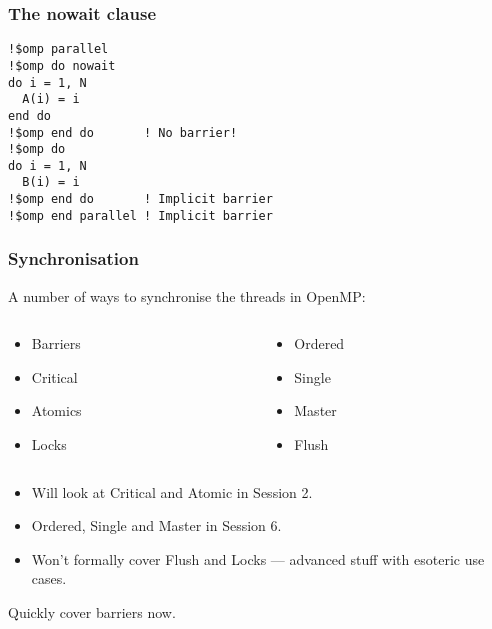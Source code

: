 \documentclass{beamer}
\begin{document}
\begin{frame}[fragile]
\frametitle{The nowait clause}

\begin{verbatim}
!$omp parallel
!$omp do nowait
do i = 1, N
  A(i) = i
end do
!$omp end do       ! No barrier!
!$omp do
do i = 1, N
  B(i) = i
!$omp end do       ! Implicit barrier
!$omp end parallel ! Implicit barrier
\end{verbatim}
\end{frame}

\begin{frame}
\frametitle{Synchronisation}
A number of ways to synchronise the threads in OpenMP:
\begin{columns}
\begin{column}{0.5\textwidth}
\begin{itemize}
  \item Barriers
  \item Critical
  \item Atomics
  \item Locks
\end{itemize}
\end{column}
\begin{column}{0.5\textwidth}
\begin{itemize}
  \item Ordered
  \item Single
  \item Master
  \item Flush
\end{itemize}
\end{column}
\end{columns}

\vfill

\begin{itemize}
  \item Will look at Critical and Atomic in Session 2.
  \item Ordered, Single and Master in Session 6.
  \item Won't formally cover Flush and Locks --- advanced stuff with esoteric use cases.
\end{itemize}

Quickly cover barriers now.

\end{frame}
\end{document}
